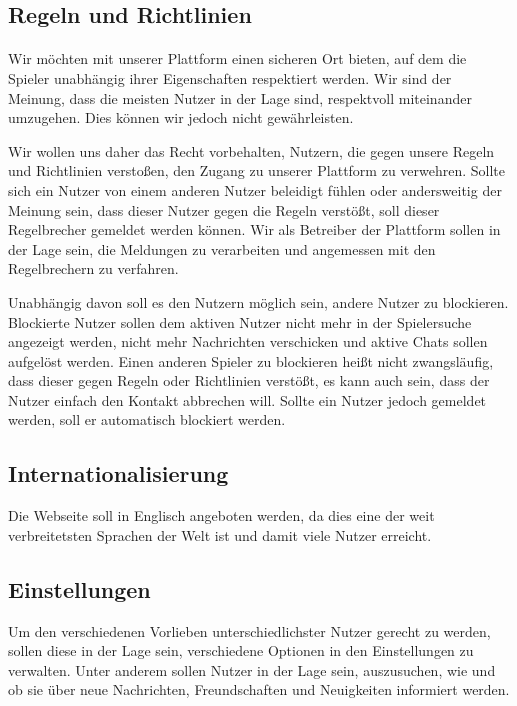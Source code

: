 \subsection{Regeln und Richtlinien}
\paragraph{}
Wir möchten mit unserer Plattform einen sicheren Ort bieten, auf dem die Spieler unabhängig ihrer Eigenschaften respektiert werden. Wir sind der Meinung, dass die meisten Nutzer in der Lage sind, respektvoll miteinander umzugehen.
Dies können wir jedoch nicht gewährleisten.

Wir wollen uns daher das Recht vorbehalten, Nutzern, die gegen unsere Regeln und Richtlinien verstoßen, den Zugang zu unserer Plattform zu verwehren. Sollte sich ein Nutzer von einem anderen Nutzer beleidigt fühlen oder andersweitig der Meinung sein, dass dieser Nutzer gegen die Regeln verstößt, soll dieser Regelbrecher gemeldet werden können. Wir als Betreiber der Plattform sollen in der Lage sein, die Meldungen zu verarbeiten und angemessen mit den Regelbrechern zu verfahren.

Unabhängig davon soll es den Nutzern möglich sein, andere Nutzer zu blockieren. Blockierte Nutzer sollen dem aktiven Nutzer nicht mehr in der Spielersuche angezeigt werden, nicht mehr Nachrichten verschicken und aktive Chats sollen aufgelöst werden. Einen anderen Spieler zu blockieren heißt nicht zwangsläufig, dass dieser gegen Regeln oder Richtlinien verstößt, es kann auch sein, dass der Nutzer einfach den Kontakt abbrechen will. Sollte ein Nutzer jedoch gemeldet werden, soll er automatisch blockiert werden.

\subsection{Internationalisierung}
Die Webseite soll in Englisch angeboten werden, da dies eine der weit verbreitetsten Sprachen der Welt ist und damit viele Nutzer erreicht.

\subsection{Einstellungen}
Um den verschiedenen Vorlieben unterschiedlichster Nutzer gerecht zu werden, sollen diese in der Lage sein, verschiedene Optionen in den Einstellungen zu verwalten. Unter anderem sollen Nutzer in der Lage sein, auszusuchen, wie und ob sie über neue Nachrichten, Freundschaften und Neuigkeiten informiert werden.

